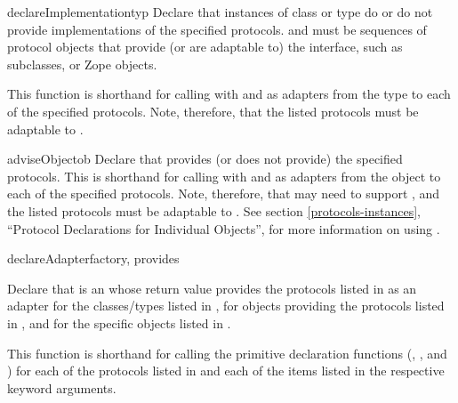 \begin{verbatim%
}
\begin{verbatim%
}
\begin{verbatim%
}
\begin{verbatim%
}
\begin{verbatim%
}
\begin{verbatim%
}
\begin{funcdesc}{declareImplementation}{typ
 }
Declare that instances of class or type  do or do not provide
implementations of the specified protocols.   and
 must be sequences of protocol objects that
provide (or are adaptable to) the  interface,
such as  subclasses, or Zope 
objects.

This function is shorthand for calling 
with  and  as adapters
from the type to each of the specified protocols.  Note, therefore, that the
listed protocols must be adaptable to .
\end{funcdesc}


\begin{funcdesc}{adviseObject}{ob
 }
Declare that  provides (or does not provide) the specified protocols.
This is shorthand for calling 
with  and  as adapters
from the object to each of the specified protocols.  Note, therefore, that
 may need to support , and the listed protocols
must be adaptable to .  See section
\ref{protocols-instances}, ``Protocol Declarations for Individual Objects'',
for more information on using .
\end{funcdesc}













\begin{funcdesc}{declareAdapter}{factory, provides
 
}

Declare that  is an  whose return value
provides the protocols listed in  as an adapter for the
classes/types listed in , for objects providing the protocols
listed in , and for the specific objects listed in
.

This function is shorthand for calling the primitive declaration
functions (,
, and )
for each of the protocols listed in  and each of the
items listed in the respective keyword arguments.
\end{funcdesc}



\end{verbatim%
}
\end{verbatim%
}
\end{verbatim%
}
\end{verbatim%
}
\end{verbatim%
}
\end{verbatim%
}
